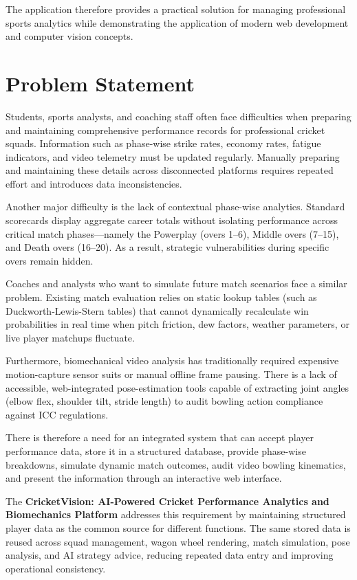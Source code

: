 The application therefore provides a practical solution for managing professional sports analytics while demonstrating the application of modern web development and computer vision concepts.

\section{Problem Statement}

Students, sports analysts, and coaching staff often face difficulties when preparing and maintaining comprehensive performance records for professional cricket squads. Information such as phase-wise strike rates, economy rates, fatigue indicators, and video telemetry must be updated regularly. Manually preparing and maintaining these details across disconnected platforms requires repeated effort and introduces data inconsistencies.

Another major difficulty is the lack of contextual phase-wise analytics. Standard scorecards display aggregate career totals without isolating performance across critical match phases—namely the Powerplay (overs 1–6), Middle overs (7–15), and Death overs (16–20). As a result, strategic vulnerabilities during specific overs remain hidden.

Coaches and analysts who want to simulate future match scenarios face a similar problem. Existing match evaluation relies on static lookup tables (such as Duckworth-Lewis-Stern tables) that cannot dynamically recalculate win probabilities in real time when pitch friction, dew factors, weather parameters, or live player matchups fluctuate.

Furthermore, biomechanical video analysis has traditionally required expensive motion-capture sensor suits or manual offline frame pausing. There is a lack of accessible, web-integrated pose-estimation tools capable of extracting joint angles (elbow flex, shoulder tilt, stride length) to audit bowling action compliance against ICC regulations.

There is therefore a need for an integrated system that can accept player performance data, store it in a structured database, provide phase-wise breakdowns, simulate dynamic match outcomes, audit video bowling kinematics, and present the information through an interactive web interface.

The \textbf{CricketVision: AI-Powered Cricket Performance Analytics and Biomechanics Platform} addresses this requirement by maintaining structured player data as the common source for different functions. The same stored data is reused across squad management, wagon wheel rendering, match simulation, pose analysis, and AI strategy advice, reducing repeated data entry and improving operational consistency.

